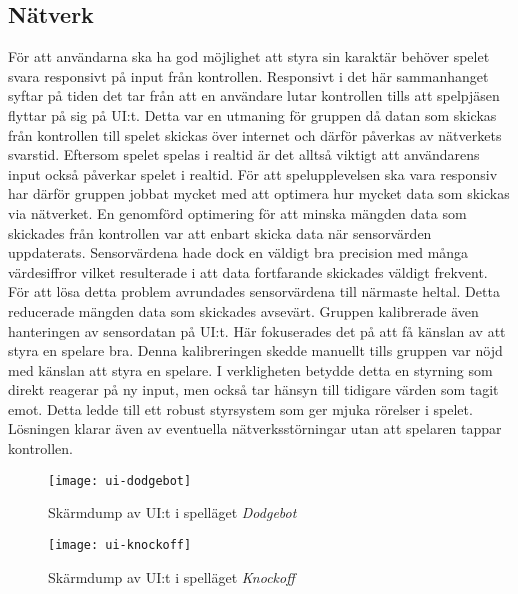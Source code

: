 \subsection{Nätverk}
För att användarna ska ha god möjlighet att styra sin karaktär behöver spelet svara responsivt på input från kontrollen. Responsivt i det här sammanhanget syftar på tiden det tar från att en användare lutar kontrollen tills att spelpjäsen flyttar på sig på UI:t. Detta var en utmaning för gruppen då datan som skickas från kontrollen till spelet skickas över internet och därför påverkas av nätverkets svarstid. Eftersom spelet spelas i realtid är det alltså viktigt att användarens input också påverkar spelet i realtid. För att spelupplevelsen ska vara responsiv har därför gruppen jobbat mycket med att optimera hur mycket data som skickas via nätverket. En genomförd optimering för att minska mängden data som skickades från kontrollen var att enbart skicka data när sensorvärden uppdaterats. Sensorvärdena hade dock en väldigt bra precision med många värdesiffror vilket resulterade i att data fortfarande skickades väldigt frekvent. För att lösa detta problem avrundades sensorvärdena till närmaste heltal. Detta reducerade mängden data som skickades avsevärt. Gruppen kalibrerade även hanteringen av sensordatan på UI:t. Här fokuserades det på att få känslan av att styra en spelare bra. Denna kalibreringen skedde manuellt tills gruppen var nöjd med känslan att styra en spelare. I verkligheten betydde detta en styrning som direkt reagerar på ny input, men också tar hänsyn till tidigare värden som tagit emot. Detta ledde till ett robust styrsystem som ger mjuka rörelser i spelet. Lösningen klarar även av eventuella nätverksstörningar utan att spelaren tappar kontrollen.

\begin{figure}[h]
    \centering
    \texttt{[image: ui-dodgebot]}
    \caption{Skärmdump av UI:t i spelläget \textit{Dodgebot}}
    \label{fig:ui-dodgebot}
\end{figure}

\begin{figure}[h]
    \centering
    \texttt{[image: ui-knockoff]}
    \caption{Skärmdump av UI:t i spelläget \textit{Knockoff}}
    \label{fig:ui-knockoff}
\end{figure}
